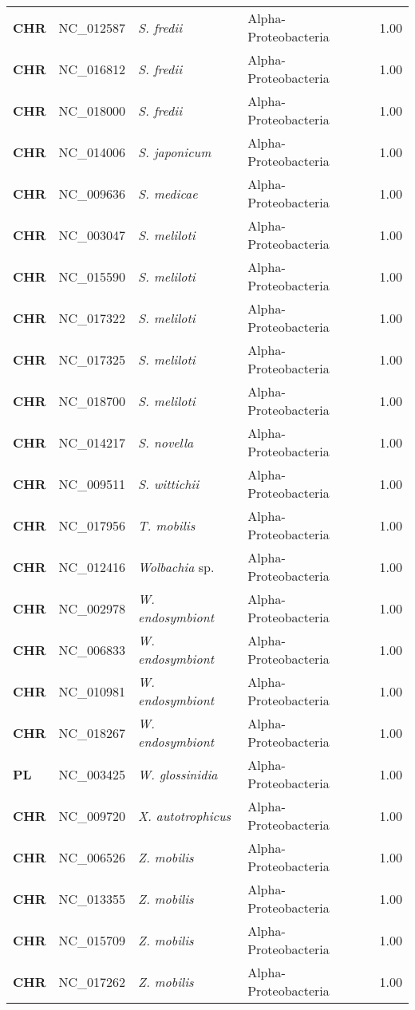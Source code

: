 \begin{adjustwidth}{-3cm}{2cm}
{\begin{supertabular}{>{\bfseries}l|p{0.1\textwidth}p{0.14\textwidth}l|l}
CHR & NC\_012587 & \textit{S. fredii} & Alpha-Proteobacteria & 1.00\\
CHR & NC\_016812 & \textit{S. fredii} & Alpha-Proteobacteria & 1.00\\
CHR & NC\_018000 & \textit{S. fredii} & Alpha-Proteobacteria & 1.00\\
CHR & NC\_014006 & \textit{S. japonicum} & Alpha-Proteobacteria & 1.00\\
CHR & NC\_009636 & \textit{S. medicae} & Alpha-Proteobacteria & 1.00\\
CHR & NC\_003047 & \textit{S. meliloti} & Alpha-Proteobacteria & 1.00\\
CHR & NC\_015590 & \textit{S. meliloti} & Alpha-Proteobacteria & 1.00\\
CHR & NC\_017322 & \textit{S. meliloti} & Alpha-Proteobacteria & 1.00\\
CHR & NC\_017325 & \textit{S. meliloti} & Alpha-Proteobacteria & 1.00\\
CHR & NC\_018700 & \textit{S. meliloti} & Alpha-Proteobacteria & 1.00\\
CHR & NC\_014217 & \textit{S. novella} & Alpha-Proteobacteria & 1.00\\
CHR & NC\_009511 & \textit{S. wittichii} & Alpha-Proteobacteria & 1.00\\
CHR & NC\_017956 & \textit{T. mobilis} & Alpha-Proteobacteria & 1.00\\
CHR & NC\_012416 & \textit{Wolbachia} sp. & Alpha-Proteobacteria & 1.00\\
CHR & NC\_002978 & \textit{W. endosymbiont} & Alpha-Proteobacteria & 1.00\\
CHR & NC\_006833 & \textit{W. endosymbiont} & Alpha-Proteobacteria & 1.00\\
CHR & NC\_010981 & \textit{W. endosymbiont} & Alpha-Proteobacteria & 1.00\\
CHR & NC\_018267 & \textit{W. endosymbiont} & Alpha-Proteobacteria & 1.00\\
PL & NC\_003425 & \textit{W. glossinidia} & Alpha-Proteobacteria & 1.00\\
CHR & NC\_009720 & \textit{X. autotrophicus} & Alpha-Proteobacteria & 1.00\\
CHR & NC\_006526 & \textit{Z. mobilis} & Alpha-Proteobacteria & 1.00\\
CHR & NC\_013355 & \textit{Z. mobilis} & Alpha-Proteobacteria & 1.00\\
CHR & NC\_015709 & \textit{Z. mobilis} & Alpha-Proteobacteria & 1.00\\
CHR & NC\_017262 & \textit{Z. mobilis} & Alpha-Proteobacteria & 1.00\\

\end{supertabular}}
\end{adjustwidth}
